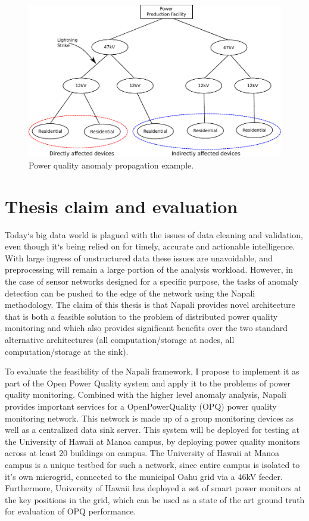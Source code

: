 \begin{figure}[h]
	\centering
	  \includegraphics[width=0.9\linewidth]{img/grid_hierarchy_cartoon.pdf}
	  \caption{Power quality anomaly propagation example.}
	  \label{intro:fig2}
\end{figure}

\section{Thesis claim and evaluation}

Today`s big data world is plagued with the issues of data cleaning and validation, even though it`s being relied on for timely, accurate and actionable intelligence. With large ingress of unstructured data these issues are unavoidable, and preprocessing will remain a large portion of the analysis workload. However, in the case of sensor networks designed for a specific purpose, the tasks of anomaly detection can be pushed to the edge of the network using the Napali methodology. The claim of this thesis is that Napali provides novel architecture that is both a feasible solution to the problem of distributed power quality monitoring and which also provides significant benefits over the two standard alternative architectures (all computation/storage at nodes, all computation/storage at the sink).

To evaluate the feasibility of the Napali framework, I propose to implement it as part of the Open Power Quality system and apply it to the problems of power quality monitoring. Combined with the higher level anomaly analysis, Napali provides important services for a OpenPowerQuality (OPQ) power quality monitoring network. This network is made up of a group  monitoring devices as well as a centralized data sink server. This system will be deployed for testing at the University of Hawaii at Manoa campus, by deploying power quality monitors across at least 20 buildings on campus. The University of Hawaii at Manoa campus is a unique testbed for such a network, since entire campus is isolated to it's own microgrid, connected to the municipal Oahu grid via a 46kV feeder. Furthermore, University of Hawaii has deployed a set of smart power monitors at the key positions in the grid, which can be used as a state of the art ground truth for evaluation of OPQ performance. 

